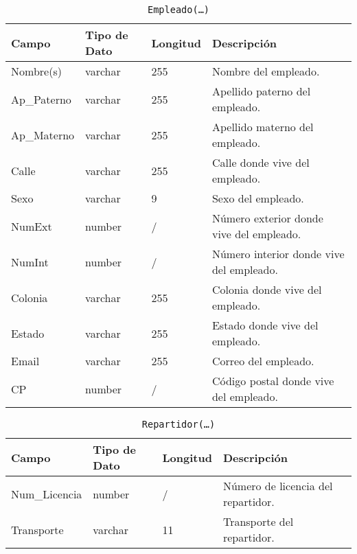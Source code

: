 \documentclass{article}
\begin{document}
\begin{table}[h]
	\centering
	\caption{\texttt{Empleado(\ldots)}}
	\begin{tabular}{|l|l|l|l|}
		\hline
		Campo       & Tipo de Dato & Longitud & Descripción                              \\ \hline
		Nombre(s)   & varchar      & 255      & Nombre del empleado.                     \\ \hline
		Ap\_Paterno & varchar      & 255      & Apellido paterno del empleado.           \\ \hline
		Ap\_Materno & varchar      & 255      & Apellido materno del empleado.           \\ \hline
		Calle       & varchar      & 255      & Calle donde vive del empleado.           \\ \hline
		Sexo 	    & varchar      & 9        & Sexo del empleado.                       \\ \hline
		NumExt      & number       & /        & Número exterior donde vive del empleado. \\ \hline
		NumInt      & number       & /        & Número interior donde vive del empleado. \\ \hline
		Colonia     & varchar      & 255      & Colonia donde vive del empleado.         \\ \hline
		Estado      & varchar      & 255      & Estado donde vive del empleado.          \\ \hline
		Email       & varchar      & 255      & Correo del empleado.                     \\ \hline
		CP          & number       & /        & Código postal donde vive del empleado.   \\ \hline
	\end{tabular}
\end{table}

\begin{table}[h]
	\centering
	\caption{\texttt{Repartidor(\ldots)}}	
	\begin{tabular}{|l|l|l|l|}
		\hline
		Campo         & Tipo de Dato & Longitud & Descripción                        \\ \hline
		Num\_Licencia & number       & /        & Número de licencia del repartidor.	\\ \hline
		Transporte    & varchar      & 11       & Transporte del repartidor.        \\ \hline
	\end{tabular}
\end{table}
\end{document}
